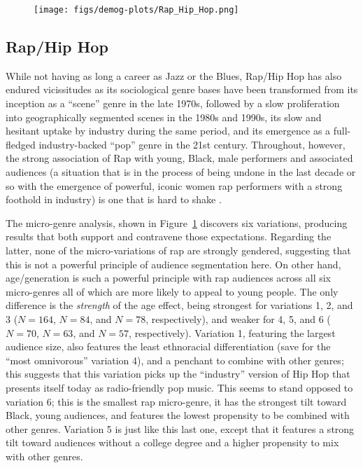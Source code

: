  \begin{figure}[ht!]
 \centering
 \texttt{[image: figs/demog-plots/Rap\_Hip\_Hop.png]}
 \caption{}
  \label{fig:rap}
 \end{figure}
 
\subsection{Rap/Hip Hop}
While not having as long a career as Jazz or the Blues, Rap/Hip Hop has also endured vicissitudes as its sociological genre bases have been transformed from its inception as a ``scene'' genre in the late 1970s, followed by a slow proliferation into geographically segmented scenes in the 1980s and 1990s, its slow and hesitant uptake by industry during the same period, and its emergence as a full-fledged industry-backed ``pop'' genre in the 21st century. Throughout, however, the strong association of Rap with young, Black, male performers and associated audiences (a situation that is in the process of being undone in the last decade or so with the emergence of powerful, iconic women rap performers with a strong foothold in industry) is one that is hard to shake \citep{lizardo_skiles16}.

The micro-genre analysis, shown in Figure~\ref{fig:rap} discovers six variations, producing results that both support and contravene those expectations. Regarding the latter, none of the micro-variations of rap are strongly gendered, suggesting that this is not a powerful principle of audience segmentation here. On other hand, age/generation is such a powerful principle with rap audiences across all six micro-genres all of which are more likely to appeal to young people. The only difference is the {\em strength} of the age effect, being strongest for variations 1, 2, and 3 ($N=164$, $N=84$, and $N=78$, respectively), and weaker for 4, 5, and 6 ($N=70$, $N=63$, and $N=57$, respectively). Variation 1, featuring the largest audience size, also features the least ethnoracial differentiation (save for the ``most omnivorous'' variation 4), and a penchant to combine with other genres; this suggests that this variation picks up the ``industry'' version of Hip Hop that presents itself today as radio-friendly pop music. This seems to stand opposed to variation 6; this is the smallest rap micro-genre, it has the strongest tilt toward Black, young audiences, and features the lowest propensity to be combined with other genres. Variation 5 is just like this last one, except that it features a strong tilt toward audiences without a college degree and a higher propensity to mix with other genres. 

